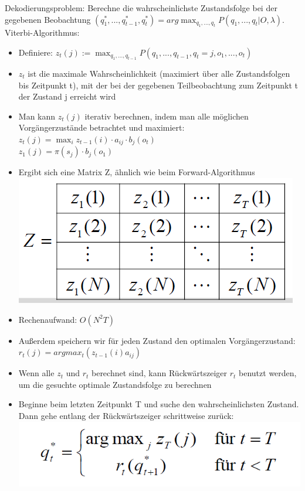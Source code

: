 \documentclass[a4paper,10pt,oneside]{article}
\begin{document}
Dekodierungsproblem: Berechne die wahrscheinlichste Zustandsfolge bei der gegebenen Beobachtung $(q_1^*,...,q_{t-1}^*,q_t^*) = arg \max_{q_1,...,q_t} P(q_1,...,q_t|O,\lambda)$. Viterbi-Algorithmus:
	\begin{itemize}
		\item Definiere: $z_t(j) := \max_{q_1,...,q_{t-1}} P(q_1,...,q_{t-1}, q_t = j, o_1,...,o_t)$
		\item $z_t$ ist die maximale Wahrscheinlichkeit (maximiert über alle Zustandsfolgen bis Zeitpunkt t), mit der bei der gegebenen Teilbeobachtung zum Zeitpunkt t der Zustand j erreicht wird
		\item Man kann $z_t(j)$ iterativ berechnen, indem man alle möglichen Vorgängerzustände betrachtet und maximiert: \\
			$z_t(j) = \max_i z_{t-1}(i) \cdot a_{ij} \cdot b_j(o_t)$\\
			$z_1(j) = \pi(s_j) \cdot b_j(o_1)$
		\item Ergibt sich eine Matrix Z, ähnlich wie beim Forward-Algorithmus \\
		\includegraphics[scale=0.2]{Grafiken/viterbi-algo.png}
		\item Rechenaufwand: $O(N^2T)$
		\item Außerdem speichern wir für jeden Zustand den optimalen Vorgängerzustand: $r_t(j) = argmax_t (z_{t-1}(i) a_{ij})$
		\item Wenn alle $z_t$ und $r_t$ berechnet sind, kann Rückwärtszeiger $r_t$ benutzt werden, um die gesuchte optimale Zustandsfolge zu berechnen
		\item Beginne beim letzten Zeitpunkt T und suche den wahrscheinlichsten Zustand. Dann gehe entlang der Rückwärtszeiger schrittweise zurück: \\
		\includegraphics[scale=0.2]{Grafiken/viterbi-algo-qt.png}
	\end{itemize}
\end{document}
